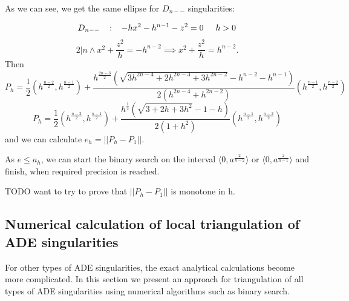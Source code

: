 As we can see, we get the same ellipse for $D_{n--}$ singularities:

$$D_{n--} \hspace{3mm} :\hspace{3mm}  -hx^2-h^{n-1}-z^2 = 0 \hspace{5mm} h>0$$
$$2|n \land x^2 + \frac{z^2}{h} = -h^{n-2} \implies x^2 + \frac{z^2}{h} = h^{n-2}.$$
Then 
$$P_h=\frac{1}{2}(h^\frac{n-2}{2},h^\frac{n-1}{2}) + \frac{h^\frac{2n-3}{2}(\sqrt{3h^{2n-4}+2h^{2n-3}+3h^{2n-2}}-h^{n-2}-h^{n-1})}{2(h^{2n-4}+h^{2n-2})}(h^\frac{n-1}{2},h^\frac{n-2}{2})$$
$$P_h=\frac{1}{2}(h^\frac{n-2}{2},h^\frac{n-1}{2}) + \frac{h^\frac{1}{2}(\sqrt{3+2h+3h^2}-1-h)}{2(1+h^2)}(h^\frac{n-1}{2},h^\frac{n-2}{2})$$
and we can calculate $e_h=||P_h-P_1||$.

As $e \leq a_h$, we can start the binary search on the interval
$\langle 0, a^\frac{2}{n-2}\rangle$ or $\langle 0, a^\frac{2}{n-1}\rangle$
and finish, when required precision is reached.

TODO want to try to prove that $||P_h-P_1||$ is monotone in h.

\subsection*{Numerical calculation of local triangulation of ADE singularities}

For other types of ADE singularities, the exact analytical calculations become more
complicated. In this section we present an approach for triangulation of all types
of ADE singularities using numerical algorithms such as binary search.

